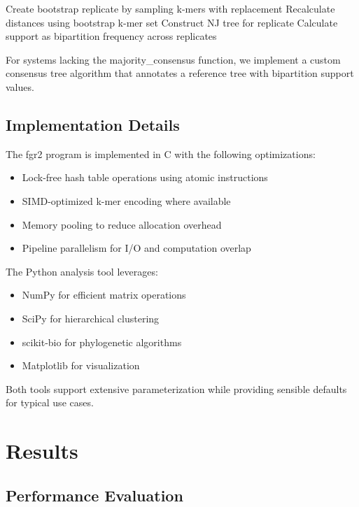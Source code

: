 \documentclass[12pt,a4paper]{article}
\begin{document}
\begin{algorithm}
\caption{Bootstrap Support Calculation}
\begin{algorithmic}[1]
\STATE Create bootstrap replicate by sampling k-mers with replacement
\STATE Recalculate distances using bootstrap k-mer set
\STATE Construct NJ tree for replicate
\ENDFOR
\STATE Calculate support as bipartition frequency across replicates
\end{algorithmic}
\end{algorithm}

For systems lacking the majority\_consensus function, we implement a custom consensus tree algorithm that annotates a reference tree with bipartition support values.

\subsection{Implementation Details}

The fgr2 program is implemented in C with the following optimizations:
\begin{itemize}
\item Lock-free hash table operations using atomic instructions
\item SIMD-optimized k-mer encoding where available
\item Memory pooling to reduce allocation overhead
\item Pipeline parallelism for I/O and computation overlap
\end{itemize}

The Python analysis tool leverages:
\begin{itemize}
\item NumPy for efficient matrix operations
\item SciPy for hierarchical clustering
\item scikit-bio for phylogenetic algorithms
\item Matplotlib for visualization
\end{itemize}

Both tools support extensive parameterization while providing sensible defaults for typical use cases.

\section{Results}

\subsection{Performance Evaluation}
\end{document}
